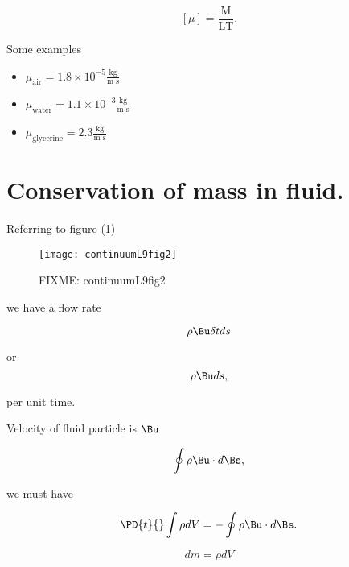 \begin{equation}\label{eqn:continuumL9:290}
[\mu] = \frac{\text{M}}{\text{L}\text{T}}.
\end{equation}

Some examples

\begin{itemize}
\item $\mu_{\text{air}} = 1.8 \times 10^{-5} \frac{\text{kg}}{\text{m s}}$
\item $\mu_{\text{water}} = 1.1 \times 10^{-3} \frac{\text{kg}}{\text{m s}}$
\item $\mu_{\text{glycerine}} = 2.3 \frac{\text{kg}}{\text{m s}}$
\end{itemize}

\section{Conservation of mass in fluid.}

Referring to figure (\ref{fig:continuumL9:continuumL9fig2})
\begin{figure}[htp]
   \centering
   \texttt{[image: continuumL9fig2]}
   \caption{FIXME: continuumL9fig2}\label{fig:continuumL9:continuumL9fig2}
\end{figure}

we have a flow rate

\begin{equation}\label{eqn:continuumL9:310}
\rho \Bu \delta t ds
\end{equation}

or 
\begin{equation}\label{eqn:continuumL9:330}
\rho \Bu ds,
\end{equation}

per unit time.

Velocity of fluid particle is $\Bu$

\begin{equation}\label{eqn:continuumL9:350}
\oint \rho \Bu \cdot d\Bs,
\end{equation}

we must have

\begin{equation}\label{eqn:continuumL9:n}
\PD{t}{} \int \rho dV 
=
-\oint \rho \Bu \cdot d\Bs.
\end{equation}

\begin{equation}\label{eqn:continuumL9:370}
dm = \rho dV
\end{equation}

